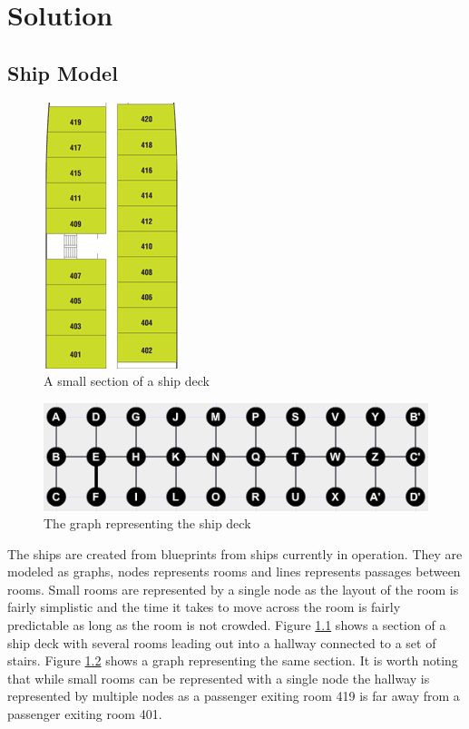 \chapter{Solution}
\label{ch:solution}



\section{Ship Model}

\begin{figure} [h]
\centering
\includegraphics[angle=90]{images/rooms.png}
\caption{A small section of a ship deck}
\label{fig:rooms}
\end{figure}

\begin{figure} [h]
\centering
\includegraphics{images/simple.png}
\caption{The graph representing the ship deck}
\label{fig:simple}
\end{figure}

The ships are created from blueprints from ships currently in operation. They are modeled as graphs, nodes represents rooms and lines represents passages between rooms. Small rooms are represented by a single node as the layout of the room is fairly simplistic and the time it takes to move across the room is fairly predictable as long as the room is not crowded. Figure \ref{fig:rooms} shows a section of a ship deck with several rooms leading out into a hallway connected to a set of stairs. Figure \ref{fig:simple} shows a graph representing the same section. It is worth noting that while small rooms can be represented with a single node the hallway is represented by multiple nodes as a passenger exiting room 419 is far away from a passenger exiting room 401.

